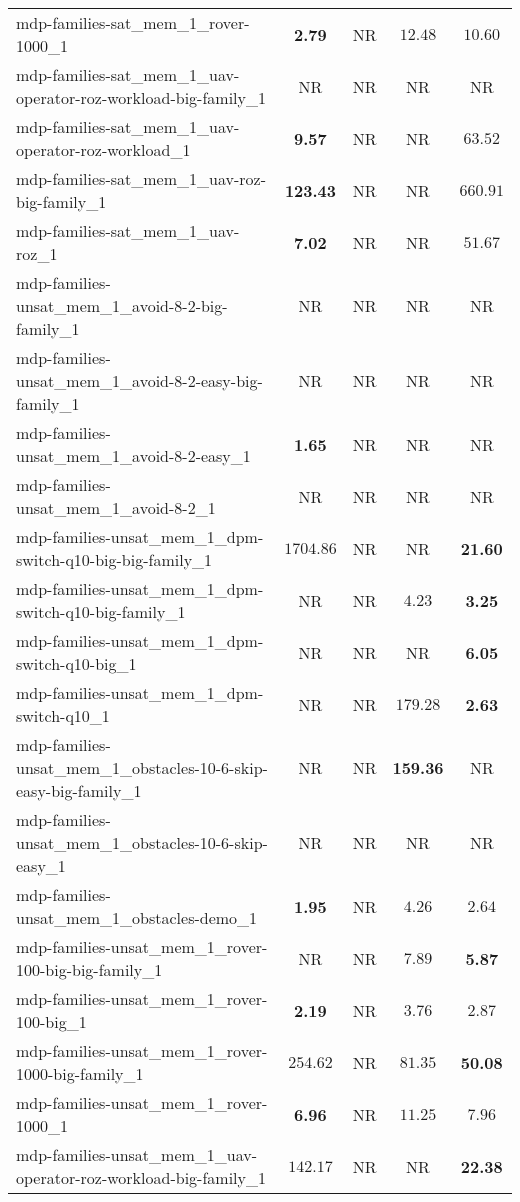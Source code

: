 \begin{tabular}{lcccc}
mdp-families-sat\_mem\_1\_rover-1000\_1 & \textbf{2.79} & NR & $12.48$ & $10.60$ \\
mdp-families-sat\_mem\_1\_uav-operator-roz-workload-big-family\_1 & NR & NR & NR & NR \\
mdp-families-sat\_mem\_1\_uav-operator-roz-workload\_1 & \textbf{9.57} & NR & NR & $63.52$ \\
mdp-families-sat\_mem\_1\_uav-roz-big-family\_1 & \textbf{123.43} & NR & NR & $660.91$ \\
mdp-families-sat\_mem\_1\_uav-roz\_1 & \textbf{7.02} & NR & NR & $51.67$ \\
mdp-families-unsat\_mem\_1\_avoid-8-2-big-family\_1 & NR & NR & NR & NR \\
mdp-families-unsat\_mem\_1\_avoid-8-2-easy-big-family\_1 & NR & NR & NR & NR \\
mdp-families-unsat\_mem\_1\_avoid-8-2-easy\_1 & \textbf{1.65} & NR & NR & NR \\
mdp-families-unsat\_mem\_1\_avoid-8-2\_1 & NR & NR & NR & NR \\
mdp-families-unsat\_mem\_1\_dpm-switch-q10-big-big-family\_1 & $1704.86$ & NR & NR & \textbf{21.60} \\
mdp-families-unsat\_mem\_1\_dpm-switch-q10-big-family\_1 & NR & NR & $4.23$ & \textbf{3.25} \\
mdp-families-unsat\_mem\_1\_dpm-switch-q10-big\_1 & NR & NR & NR & \textbf{6.05} \\
mdp-families-unsat\_mem\_1\_dpm-switch-q10\_1 & NR & NR & $179.28$ & \textbf{2.63} \\
mdp-families-unsat\_mem\_1\_obstacles-10-6-skip-easy-big-family\_1 & NR & NR & \textbf{159.36} & NR \\
mdp-families-unsat\_mem\_1\_obstacles-10-6-skip-easy\_1 & NR & NR & NR & NR \\
mdp-families-unsat\_mem\_1\_obstacles-demo\_1 & \textbf{1.95} & NR & $4.26$ & $2.64$ \\
mdp-families-unsat\_mem\_1\_rover-100-big-big-family\_1 & NR & NR & $7.89$ & \textbf{5.87} \\
mdp-families-unsat\_mem\_1\_rover-100-big\_1 & \textbf{2.19} & NR & $3.76$ & $2.87$ \\
mdp-families-unsat\_mem\_1\_rover-1000-big-family\_1 & $254.62$ & NR & $81.35$ & \textbf{50.08} \\
mdp-families-unsat\_mem\_1\_rover-1000\_1 & \textbf{6.96} & NR & $11.25$ & $7.96$ \\
mdp-families-unsat\_mem\_1\_uav-operator-roz-workload-big-family\_1 & $142.17$ & NR & NR & \textbf{22.38} \\

\end{tabular}
